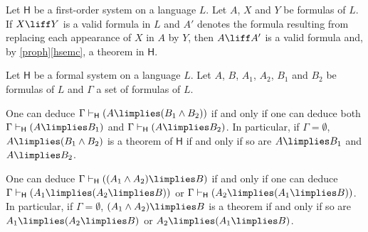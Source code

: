 \begin{lemma}
Let $\mathsf{H}$ be a first-order system on a language $L$. Let $A$, $X$ and $Y$ be formulas of $L$. If $X\liff Y$ is a valid formula in $L$ and $A'$ denotes the formula resulting from replacing each appearance of $X$ in $A$ by $Y$, then $A\liff A'$ is a valid formula and, by \ref{proph}\ref{hsemc}, a theorem in $\mathsf{H}$.
\end{lemma}



\begin{proposition}
Let $\mathsf{H}$ be a formal system on a language $L$. Let $A$, $B$, $A_1$, $A_2$, $B_1$ and $B_2$ be formulas of $L$ and $\Gamma$ a set of formulas of $L$.
\begin{statements}
\item One can deduce $\Gamma \vdash_\mathsf{H} (A \limplies (B_1\land B_2))$ if and only if one can deduce both $\Gamma \vdash_\mathsf{H} (A\limplies B_1)$ and $\Gamma \vdash_\mathsf{H} (A\limplies B_2)$. In particular, if $\Gamma = \emptyset$, $A\limplies (B_1\land B_2)$ is a theorem of $\mathsf{H}$ if and only if so are $A\limplies B_1$ and $A \limplies B_2$.

\item One can deduce $\Gamma \vdash_\mathsf{H} ( (A_1\land A_2) \limplies B )$ if and only if one can deduce $\Gamma \vdash_\mathsf{H} (A_1 \limplies (A_2 \limplies B))$ or $\Gamma \vdash_\mathsf{H} (A_2 \limplies (A_1 \limplies B))$. In particular, if $\Gamma = \emptyset$, $(A_1\land A_2) \limplies B$ is a theorem if and only if so are $A_1\limplies (A_2\limplies B)$ or $A_2 \limplies (A_1 \limplies B)$.
\end{statements}
\label{implesmani}
\end{proposition}


